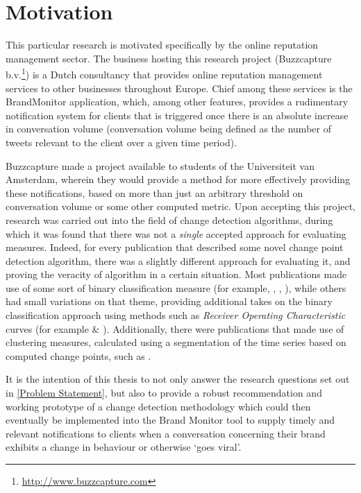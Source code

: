 \documentclass[../main.tex]{subfiles}
\begin{document}
\section{Motivation}

This particular research is motivated specifically by the online reputation management sector. The business hosting this research project (Buzzcapture b.v.\footnote{\url{http://www.buzzcapture.com}}) is a Dutch consultancy that provides online reputation management services to other businesses throughout Europe. Chief among these services is the BrandMonitor application, which, among other features, provides a rudimentary notification system for clients that is triggered once there is an absolute increase in conversation volume (conversation volume being defined as the number of tweets relevant to the client over a given time period).

Buzzcapture made a project available to students of the Universiteit van Amsterdam, wherein they would provide a method for more effectively providing these notifications, based on more than just an arbitrary threshold on conversation volume or some other computed metric. Upon accepting this project, research was carried out into the field of change detection algorithms, during which it was found that there was not a \emph{single} accepted approach for evaluating measures. Indeed, for every publication that described some novel change point detection algorithm, there was a slightly different approach for evaluating it, and proving the veracity of algorithm in a certain situation. Most publications made use of some sort of binary classification measure (for example, \cite{Qahtan2015}, \cite{Buntain2014}, \cite{Pelecanos2010}), while others had small variations on that theme, providing additional takes on the binary classification approach using methods such as \emph{Receiver Operating Characteristic} curves (for example \cite{Fawcett1999} \& \cite{Desobry2005}). Additionally, there were publications that made use of clustering measures, calculated using a segmentation of the time series based on computed change points, such as \cite{Matteson2012}.

It is the intention of this thesis to not only answer the research questions set out in \autoref{Problem Statement}, but also to provide a robust recommendation and working prototype of a change detection methodology which could then eventually be implemented into the Brand Monitor tool to supply timely and relevant notifications to clients when a conversation concerning their brand exhibits a change in behaviour or otherwise `goes viral'.
\end{document}
